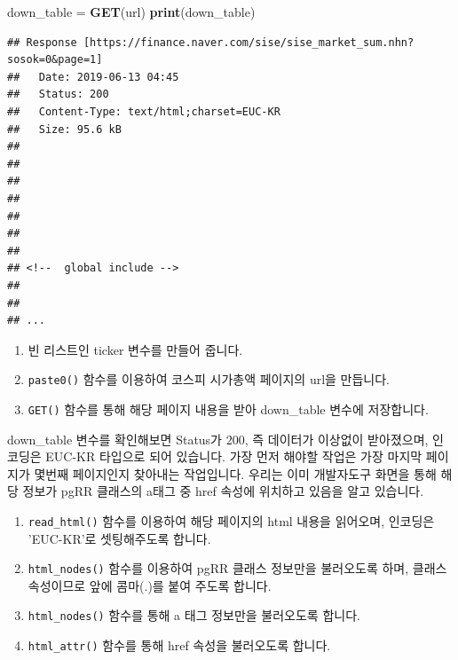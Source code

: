 \documentclass[]{book}
\newenvironment{Shaded}{\begin{snugshade}}{\end{snugshade}}
\newcommand{\DataTypeTok}[1]{\textcolor[rgb]{0.13,0.29,0.53}{#1}}
\newcommand{\KeywordTok}[1]{\textcolor[rgb]{0.13,0.29,0.53}{\textbf{#1}}}
\newcommand{\NormalTok}[1]{#1}
\newcommand{\OperatorTok}[1]{\textcolor[rgb]{0.81,0.36,0.00}{\textbf{#1}}}
\newcommand{\StringTok}[1]{\textcolor[rgb]{0.31,0.60,0.02}{#1}}
\providecommand{\tightlist}{%
  \setlength{\itemsep}{0pt}\setlength{\parskip}{0pt}}
\begin{document}
\begin{Shaded}
\begin{Highlighting}[]
\NormalTok{down_table =}\StringTok{ }\KeywordTok{GET}\NormalTok{(url)}
\KeywordTok{print}\NormalTok{(down_table)}
\end{Highlighting}
\end{Shaded}

\begin{verbatim}
## Response [https://finance.naver.com/sise/sise_market_sum.nhn?sosok=0&page=1]
##   Date: 2019-06-13 04:45
##   Status: 200
##   Content-Type: text/html;charset=EUC-KR
##   Size: 95.6 kB
## 
## 
## 
## 
## 
## 
## 
## <!--  global include -->
## 
##  
## ...
\end{verbatim}

\begin{enumerate}
\def\labelenumi{\arabic{enumi}.}
\tightlist
\item
  빈 리스트인 ticker 변수를 만들어 줍니다.
\item
  \texttt{paste0()} 함수를 이용하여 코스피 시가총액 페이지의 url을 만듭니다.
\item
  \texttt{GET()} 함수를 통해 해당 페이지 내용을 받아 down\_table 변수에 저장합니다.
\end{enumerate}

down\_table 변수를 확인해보면 Status가 200, 즉 데이터가 이상없이 받아졌으며, 인코딩은 EUC-KR 타입으로 되어 있습니다. 가장 먼저 해야할 작업은 가장 마지막 페이지가 몇번째 페이지인지 찾아내는 작업입니다. 우리는 이미 개발자도구 화면을 통해 해당 정보가 pgRR 클래스의 a태그 중 href 속성에 위치하고 있음을 알고 있습니다.

\begin{Shaded}
\end{Shaded}

\begin{enumerate}
\def\labelenumi{\arabic{enumi}.}
\tightlist
\item
  \texttt{read\_html()} 함수를 이용하여 해당 페이지의 html 내용을 읽어오며, 인코딩은 'EUC-KR'로 셋팅해주도록 합니다.
\item
  \texttt{html\_nodes()} 함수를 이용하여 pgRR 클래스 정보만을 불러오도록 하며, 클래스 속성이므로 앞에 콤마(.)를 붙여 주도록 합니다.
\item
  \texttt{html\_nodes()} 함수를 통해 a 태그 정보만을 불러오도록 합니다.
\item
  \texttt{html\_attr()} 함수를 통해 href 속성을 불러오도록 합니다.
\end{enumerate}
\end{document}
